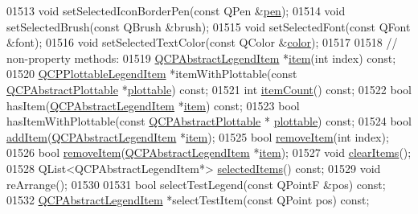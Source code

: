 \begin{DoxyCode}
01513   \textcolor{keywordtype}{void} setSelectedIconBorderPen(\textcolor{keyword}{const} QPen &\hyperlink{a00116_a1f13fffa0a0faac34ec342973e613a4a}{pen});
01514   \textcolor{keywordtype}{void} setSelectedBrush(\textcolor{keyword}{const} QBrush &brush);
01515   \textcolor{keywordtype}{void} setSelectedFont(\textcolor{keyword}{const} QFont &font);
01516   \textcolor{keywordtype}{void} setSelectedTextColor(\textcolor{keyword}{const} QColor &\hyperlink{a00116_ae35093fbf4f645dcefd930ca8c68b622}{color});
01517 
01518   \textcolor{comment}{// non-property methods:}
01519   \hyperlink{a00023}{QCPAbstractLegendItem} *\hyperlink{a00116_aac743a709d025448e36cb65c9117d64b}{item}(\textcolor{keywordtype}{int} index) \textcolor{keyword}{const};
01520   \hyperlink{a00048}{QCPPlottableLegendItem} *itemWithPlottable(\textcolor{keyword}{const} 
      \hyperlink{a00024}{QCPAbstractPlottable} *\hyperlink{a00116_a5c198d46ea2a2255a1b73e2c590f0364}{plottable}) \textcolor{keyword}{const};
01521   \textcolor{keywordtype}{int} \hyperlink{a00116_a7ec4c2b995ae77fc3ecade97c42c52e0}{itemCount}() \textcolor{keyword}{const};
01522   \textcolor{keywordtype}{bool} hasItem(\hyperlink{a00023}{QCPAbstractLegendItem} *\hyperlink{a00116_aac743a709d025448e36cb65c9117d64b}{item}) \textcolor{keyword}{const};
01523   \textcolor{keywordtype}{bool} hasItemWithPlottable(\textcolor{keyword}{const} \hyperlink{a00024}{QCPAbstractPlottable} *
      \hyperlink{a00116_a5c198d46ea2a2255a1b73e2c590f0364}{plottable}) \textcolor{keyword}{const};
01524   \textcolor{keywordtype}{bool} \hyperlink{a00116_a5207a6de1832fa2c156c9e0338e49810}{addItem}(\hyperlink{a00023}{QCPAbstractLegendItem} *\hyperlink{a00116_aac743a709d025448e36cb65c9117d64b}{item});
01525   \textcolor{keywordtype}{bool} \hyperlink{a00116_ae68a4ab305034c0fe733a95704e4db5e}{removeItem}(\textcolor{keywordtype}{int} index);
01526   \textcolor{keywordtype}{bool} \hyperlink{a00116_ae68a4ab305034c0fe733a95704e4db5e}{removeItem}(\hyperlink{a00023}{QCPAbstractLegendItem} *\hyperlink{a00116_aac743a709d025448e36cb65c9117d64b}{item});
01527   \textcolor{keywordtype}{void} \hyperlink{a00116_a9d204691a56aadcba8365a49637fa145}{clearItems}();
01528   QList<QCPAbstractLegendItem*> \hyperlink{a00116_a3714adb0a26b8cf1bd70740a7ea464c4}{selectedItems}() \textcolor{keyword}{const};
01529   \textcolor{keywordtype}{void} reArrange();
01530   
01531   \textcolor{keywordtype}{bool} selectTestLegend(\textcolor{keyword}{const} QPointF &pos) \textcolor{keyword}{const};
01532   \hyperlink{a00023}{QCPAbstractLegendItem} *selectTestItem(\textcolor{keyword}{const} QPoint pos) \textcolor{keyword}{const};

\end{DoxyCode}
